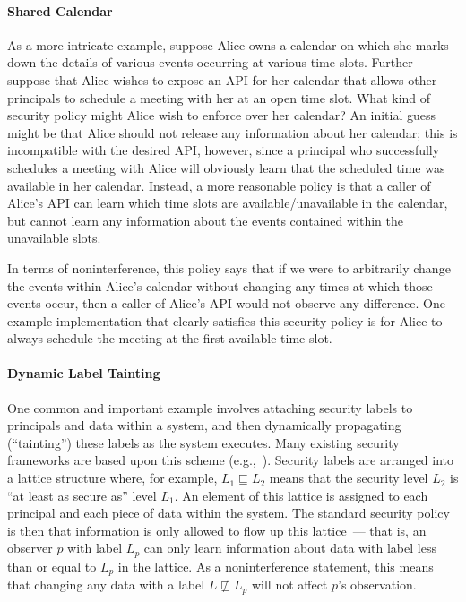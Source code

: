 \paragraph{Shared Calendar}
As a more intricate example, suppose Alice owns a calendar on which she
marks down the details of various events occurring at various time slots.
Further suppose that Alice wishes to expose an API for her calendar that
allows other principals to schedule a meeting with her at an open time slot.
What kind of security policy might Alice wish to enforce over her calendar?
An initial guess might be that Alice should not release any information
about her calendar; this is incompatible with the desired API, however, since
a principal who successfully schedules a meeting with Alice will obviously
learn that the scheduled time was available in her calendar. Instead, a
more reasonable policy is that a caller of Alice's API can learn which time
slots are available/unavailable in the calendar, but cannot learn any 
information about the events contained within the unavailable slots.

In terms of noninterference, this policy says that if we were to arbitrarily
change the events within Alice's calendar without changing any times at
which those events occur, then a caller of Alice's API would not observe any
difference. One example implementation that clearly satisfies this security
policy is for Alice to always schedule the meeting at the first available 
time slot.

\paragraph{Dynamic Label Tainting}
One common and important example involves attaching security labels to 
principals and data within a system, and then dynamically propagating 
(``tainting'') these labels 
as the system executes. Many existing security frameworks are based upon
this scheme (e.g.,~\cite{austin09,zdancewic02,hritcu13,flume,resin}). Security labels are arranged into
a lattice structure where, for example, $L_1 \sqsubseteq L_2$ means that the
security level $L_2$ is ``at least as secure as'' level $L_1$. An element of
this lattice is assigned to each principal and each piece of data
within the system. The standard security policy is then that information is 
only allowed to flow up this lattice~--- that is, an observer $p$ with
label $L_p$ can only learn information about data with label less than or
equal to $L_p$ in the lattice. As a noninterference statement, this means 
that changing any data with a label $L \not\sqsubseteq L_p$ will
not affect $p$'s observation.

